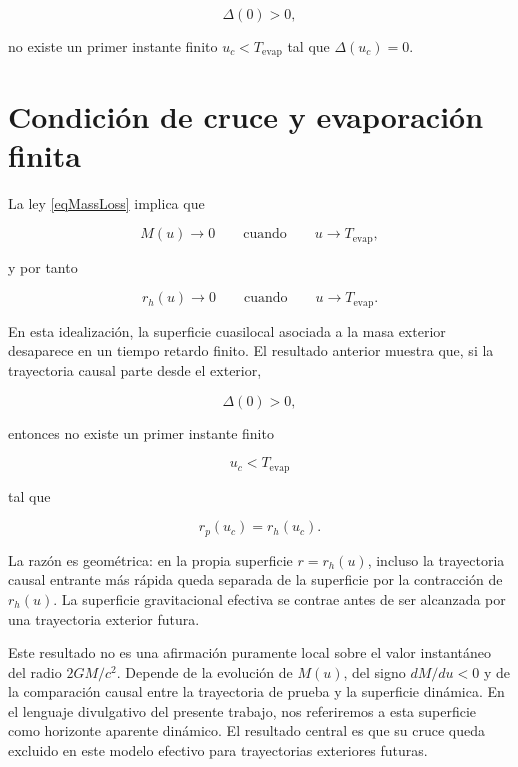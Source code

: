 \documentclass[
aps,
prd,
reprint,
superscriptaddress,
nofootinbib,
amsmath,
amssymb
]{revtex4-2}
\begin{document}
\begin{equation}
\Delta(0)>0,
\end{equation}

no existe un primer instante finito $u_c<T_{\mathrm{evap}}$ tal que $\Delta(u_c)=0$.

\section{Condición de cruce y evaporación finita}

La ley \eqref{eqMassLoss} implica que

\begin{equation}
M(u)\rightarrow 0
\qquad
\mathrm{cuando}
\qquad
u\rightarrow T_{\mathrm{evap}},
\end{equation}

y por tanto

\begin{equation}
r_h(u)\rightarrow 0
\qquad
\mathrm{cuando}
\qquad
u\rightarrow T_{\mathrm{evap}}.
\end{equation}

En esta idealización, la superficie cuasilocal asociada a la masa exterior desaparece en un tiempo retardo finito. El resultado anterior muestra que, si la trayectoria causal parte desde el exterior,

\begin{equation}
\Delta(0)>0,
\end{equation}

entonces no existe un primer instante finito

\begin{equation}
u_c<T_{\mathrm{evap}}
\end{equation}

tal que

\begin{equation}
r_p(u_c)=r_h(u_c).
\end{equation}

La razón es geométrica: en la propia superficie $r=r_h(u)$, incluso la trayectoria causal entrante más rápida queda separada de la superficie por la contracción de $r_h(u)$. La superficie gravitacional efectiva se contrae antes de ser alcanzada por una trayectoria exterior futura.

Este resultado no es una afirmación puramente local sobre el valor instantáneo del radio $2GM/c^2$. Depende de la evolución de $M(u)$, del signo $dM/du<0$ y de la comparación causal entre la trayectoria de prueba y la superficie dinámica. En el lenguaje divulgativo del presente trabajo, nos referiremos a esta superficie como horizonte aparente dinámico. El resultado central es que su cruce queda excluido en este modelo efectivo para trayectorias exteriores futuras.
\end{document}
